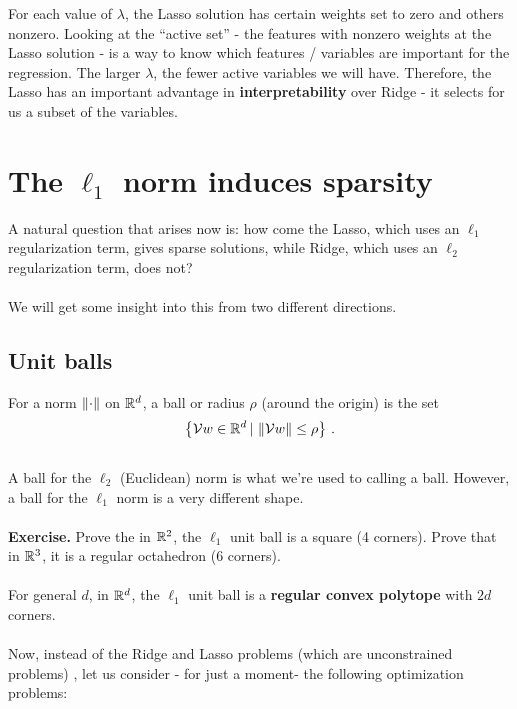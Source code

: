 For each value of $\lambda$, the Lasso solution has certain weights set to zero
and others nonzero. Looking at the ``active set'' - the features with nonzero
weights at the Lasso solution - is a way to know which features / variables are
important for the regression. The larger $\lambda$, the fewer active variables
we will have. Therefore, the Lasso has an important advantage in {\bf
interpretability} over Ridge - it selects for us a subset of the variables.

\section{The $\ell_1$ norm induces sparsity}

A natural question that arises now is: how come the Lasso, which uses an $\ell_1$
regularization term, gives sparse solutions, while Ridge, which uses an $\ell_2$
regularization term, does not?
\\~\\
We will get some insight into this from two different directions.

\subsection{Unit balls}

For a norm $\left\| \cdot\right\|$ on $\mathbb{R}^d$, a ball or radius $\rho$ (around the origin)
is the set
\[
  \left\{ \mathcal{V}{w}\in\mathbb{R}^d \,|\, \left\| \mathcal{V}{w}\right\|\leq \rho \right\}\,.
\]
~\\
A ball for the $\ell_2$ (Euclidean) norm is what we're used to calling a ball.
However, a ball for the $\ell_1$ norm is a very different shape.
\\~\\
{\bf Exercise.} Prove the in $\mathbb{R}^2$, the $\ell_1$ unit ball is a square (4
corners). Prove
that in $\mathbb{R}^3$, it is a regular octahedron (6 corners). 
\\~\\
For general $d$, in $\mathbb{R}^d$, the $\ell_1$ unit ball is a  
{\bf regular convex polytope} with $2d$
corners.  
\\~\\
Now, instead of the Ridge and Lasso problems (which are unconstrained problems)
, let us consider - for just a moment- the following
optimization problems:

